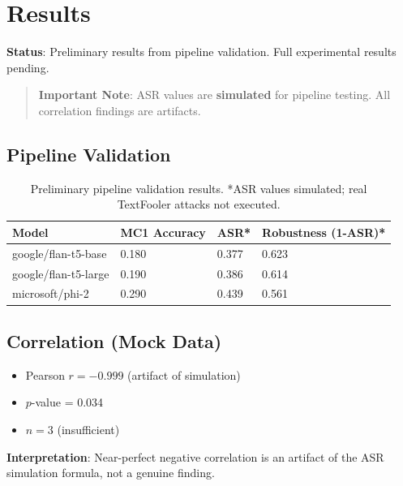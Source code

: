\section{Results}

\textbf{Status}: Preliminary results from pipeline validation. Full experimental results pending.

\begin{quote}
\textbf{Important Note}: ASR values are \textbf{simulated} for pipeline testing. All correlation findings are artifacts.
\end{quote}

\subsection{Pipeline Validation}

\begin{table}[h]
\centering
\caption{Preliminary pipeline validation results. *ASR values simulated; real TextFooler attacks not executed.}
\label{tab:results}
\begin{tabular}{llll}
\toprule
Model & MC1 Accuracy & ASR* & Robustness (1-ASR)* \\
\midrule
google/flan-t5-base & 0.180 & 0.377 & 0.623 \\
google/flan-t5-large & 0.190 & 0.386 & 0.614 \\
microsoft/phi-2 & 0.290 & 0.439 & 0.561 \\
\bottomrule
\end{tabular}
\end{table}

\subsection{Correlation (Mock Data)}

\begin{itemize}
    \item Pearson $r = -0.999$ (artifact of simulation)
    \item $p$-value = 0.034
    \item $n = 3$ (insufficient)
\end{itemize}

\textbf{Interpretation}: Near-perfect negative correlation is an artifact of the ASR simulation formula, not a genuine finding.
